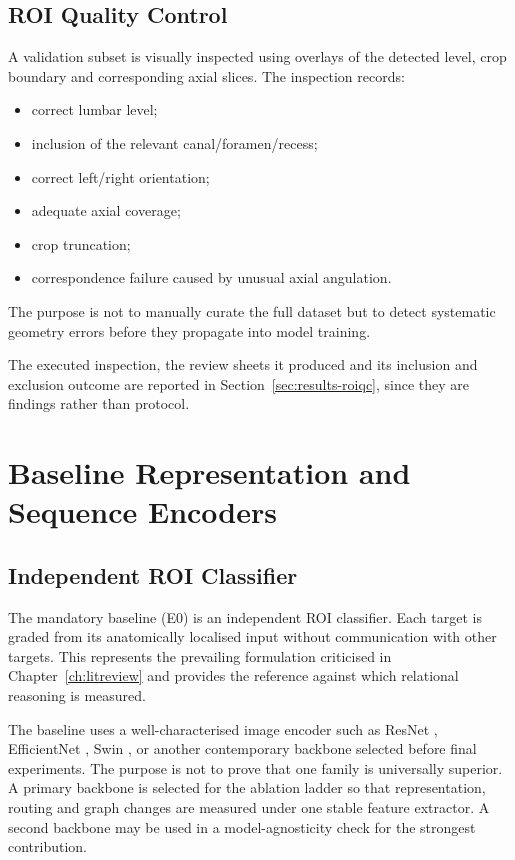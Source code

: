 \subsection{ROI Quality Control}
\label{sec:method-roi-qc}

A validation subset is visually inspected using overlays of the detected level,
crop boundary and corresponding axial slices. The inspection records:

\begin{itemize}
  \item correct lumbar level;
  \item inclusion of the relevant canal/foramen/recess;
  \item correct left/right orientation;
  \item adequate axial coverage;
  \item crop truncation;
  \item correspondence failure caused by unusual axial angulation.
\end{itemize}

The purpose is not to manually curate the full dataset but to detect systematic
geometry errors before they propagate into model training.

The executed inspection, the review sheets it produced and its inclusion and
exclusion outcome are reported in Section~\ref{sec:results-roiqc}, since they are
findings rather than protocol.

\section{Baseline Representation and Sequence Encoders}
\label{sec:method-baseline}

\subsection{Independent ROI Classifier}
\label{sec:method-e0}

The mandatory baseline (E0) is an independent ROI classifier. Each target is
graded from its anatomically localised input without communication with other
targets. This represents the prevailing formulation criticised in
Chapter~\ref{ch:litreview} and provides the reference against which relational
reasoning is measured.

The baseline uses a well-characterised image encoder such as ResNet
\cite{he2016deep}, EfficientNet \cite{tan2019efficientnet}, Swin
\cite{liu2021swin}, or another contemporary backbone selected before final
experiments. The purpose is not to prove that one family is universally
superior. A primary backbone is selected for the ablation ladder so that
representation, routing and graph changes are measured under one stable
feature extractor. A second backbone may be used in a model-agnosticity check
for the strongest contribution.

